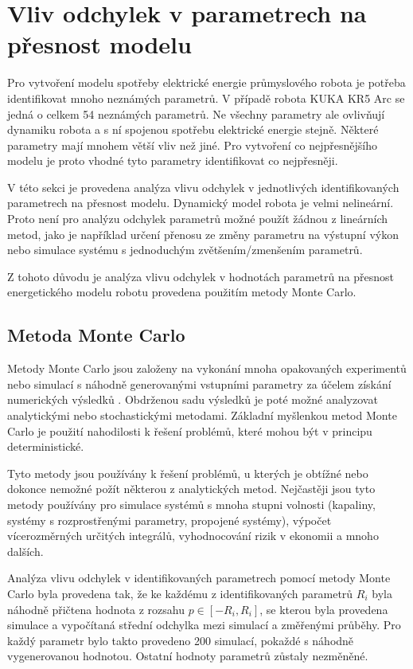 \chapter{Vliv odchylek v parametrech na přesnost modelu}

Pro vytvoření modelu spotřeby elektrické energie průmyslového robota je potřeba identifikovat mnoho neznámých parametrů. V případě robota KUKA KR5 Arc se jedná o celkem 54 neznámých parametrů. Ne všechny parametry ale ovlivňují dynamiku robota a s ní spojenou spotřebu elektrické energie stejně. Některé parametry mají mnohem větší vliv než jiné. Pro vytvoření co nejpřesnějšího modelu je proto vhodné tyto parametry identifikovat co nejpřesněji. 

V této sekci je provedena analýza vlivu odchylek v jednotlivých identifikovaných parametrech na přesnost modelu. Dynamický model robota je velmi nelineární. Proto není pro analýzu odchylek parametrů možné použít žádnou z lineárních metod, jako je například určení přenosu ze změny parametru na výstupní výkon nebo simulace systému s jednoduchým zvětšením/zmenšením parametrů. 

Z tohoto důvodu je analýza vlivu odchylek v hodnotách parametrů na přesnost energetického modelu robotu provedena použitím metody Monte Carlo. 

\section{Metoda Monte Carlo}

Metody Monte Carlo jsou založeny na vykonání mnoha opakovaných experimentů nebo simulací s náhodně generovanými vstupními parametry za účelem získání numerických výsledků \cite{monte_carlo_ref}. Obdrženou sadu výsledků je poté možné analyzovat analytickými nebo stochastickými metodami. Základní myšlenkou metod Monte Carlo je použití nahodilosti k řešení problémů, které mohou být v principu deterministické.

Tyto metody jsou používány k řešení problémů, u kterých je obtížné nebo dokonce nemožné požít některou z analytických metod. Nejčastěji jsou tyto metody používány pro simulace systémů s mnoha stupni volnosti (kapaliny, systémy s rozprostřenými parametry, propojené systémy), výpočet vícerozměrných určitých integrálů, vyhodnocování rizik v ekonomii a mnoho dalších. 

Analýza vlivu odchylek v identifikovaných parametrech pomocí metody Monte Carlo byla provedena tak, že ke každému z identifikovaných parametrů $R_i$ byla náhodně přičtena hodnota z rozsahu $p \in [-R_i,R_i]$, se kterou byla provedena simulace a vypočítaná střední odchylka mezi simulací a změřenými průběhy. Pro každý parametr bylo takto provedeno 200 simulací, pokaždé s náhodně vygenerovanou hodnotou. Ostatní hodnoty parametrů zůstaly nezměněné. 

